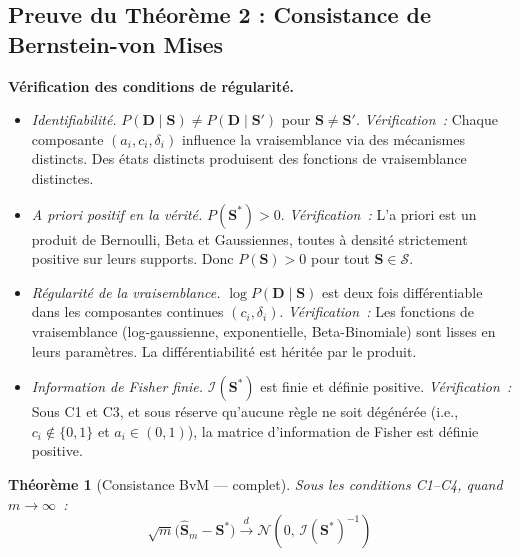 \documentclass[letterpaper]{article}
\newtheorem{theoreme}{Th\'eor\`eme}
\begin{document}
\subsection{Preuve du Th\'eor\`eme 2 : Consistance de Bernstein-von Mises}

\textbf{V\'erification des conditions de r\'egularit\'e.}

\begin{itemize}[leftmargin=2em]
  \item[\textbf{C1}] \textit{Identifiabilit\'e.}
        $P(\mathbf{D} \mid \mathbf{S}) \neq P(\mathbf{D} \mid \mathbf{S}')$
        pour $\mathbf{S} \neq \mathbf{S}'$.
        \textit{V\'erification~:} Chaque composante $(a_i, c_i, \delta_i)$
        influence la vraisemblance via des m\'ecanismes distincts.
        Des \'etats distincts produisent des fonctions de vraisemblance
        distinctes.

  \item[\textbf{C2}] \textit{A priori positif en la v\'erit\'e.}
        $P(\mathbf{S}^*) > 0$.
        \textit{V\'erification~:} L'a priori est un produit de Bernoulli,
        Beta et Gaussiennes, toutes \`a densit\'e strictement positive sur
        leurs supports. Donc $P(\mathbf{S}) > 0$ pour tout $\mathbf{S}
        \in \mathcal{S}$.

  \item[\textbf{C3}] \textit{R\'egularit\'e de la vraisemblance.}
        $\log P(\mathbf{D} \mid \mathbf{S})$ est deux fois
        diff\'erentiable dans les composantes continues $(c_i, \delta_i)$.
        \textit{V\'erification~:} Les fonctions de vraisemblance
        (log-gaussienne, exponentielle, Beta-Binomiale) sont lisses en
        leurs param\`etres. La diff\'erentiabilit\'e est h\'erit\'ee
        par le produit.

  \item[\textbf{C4}] \textit{Information de Fisher finie.}
        $\mathcal{I}(\mathbf{S}^*)$ est finie et d\'efinie positive.
        \textit{V\'erification~:} Sous C1 et C3, et sous r\'eserve
        qu'aucune r\`egle ne soit d\'eg\'en\'er\'ee (i.e., $c_i \notin
        \{0,1\}$ et $a_i \in (0,1)$), la matrice d'information de Fisher
        est d\'efinie positive.
\end{itemize}

\begin{theoreme}[Consistance BvM --- complet]
Sous les conditions C1--C4, quand $m \to \infty$~:
\[
  \sqrt{m}\bigl(\hat{\mathbf{S}}_m - \mathbf{S}^*\bigr)
  \xrightarrow{d} \mathcal{N}\!\left(0,\, \mathcal{I}(\mathbf{S}^*)^{-1}\right)
\]
\end{theoreme}
\end{document}
